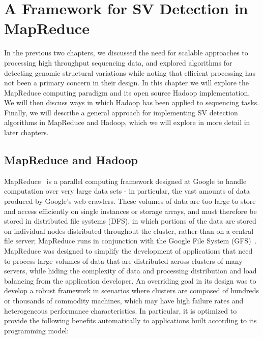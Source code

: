\chapter{A Framework for SV Detection in MapReduce}\label{chap_framework}

In the previous two chapters, we discussed the need for scalable approaches to processing high throughput sequencing data, and explored algorithms for detecting genomic structural variations while noting that efficient processing has not been a primary concern in their design. In this chapter we will explore the MapReduce computing paradigm and its open source Hadoop implementation. We will then discuss ways in which Hadoop has been applied to sequencing tasks. Finally, we will describe a general approach for implementing SV detection algorithms in MapReduce and Hadoop, which we will explore in more detail in later chapters.

\section{MapReduce and Hadoop}\label{section_hadoop_description}

MapReduce~\cite{Dean:2008p277} is a parallel computing framework designed at Google to handle computation over very large data sets - in particular, the vast amounts of data produced by Google's web crawlers. These volumes of data are too large to store and access efficiently on single instances or storage arrays, and must therefore be stored in distributed file systems (DFS), in which portions of the data are stored on individual nodes distributed throughout the cluster, rather than on a central file server; MapReduce runs in conjunction with the Google File System (GFS)~\cite{Ghemawat:2003:GFS:945445.945450}. MapReduce was designed to simplify the development of applications that need to process large volumes of data that are distributed across clusters of many servers, while hiding the complexity of data and processing distribution and load balancing from the application developer. An overriding goal in its design was to develop a robust framework in scenarios where clusters are composed of hundreds or thousands of commodity machines, which may have high failure rates and heterogeneous performance characteristics. In particular, it is optimized to provide the following benefits automatically to applications built according to its programming model:

